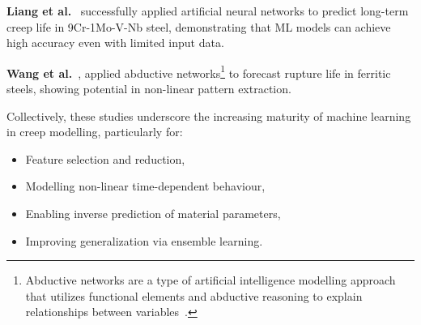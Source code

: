 \documentclass[class=scrbook, crop=false]{standalone}
\begin{document}
\textbf{Liang et al.}~\cite{liang2020ann} successfully applied artificial neural networks to predict long-term creep life in 9Cr-1Mo-V-Nb steel, demonstrating that ML models can achieve high accuracy even with limited input data. 

\textbf{Wang et al.}~\cite{wang2013abductive}, applied abductive networks\footnote{Abductive networks are a type of artificial intelligence modelling approach that utilizes functional elements and abductive reasoning to explain relationships between variables~\cite{montgomery1991abductive}.} to forecast rupture life in ferritic steels, showing potential in non-linear pattern extraction.


Collectively, these studies underscore the increasing maturity of machine learning in creep modelling, particularly for:
\begin{itemize}
	\item Feature selection and reduction,
	\item Modelling non-linear time-dependent behaviour,
	\item Enabling inverse prediction of material parameters,
	\item Improving generalization via ensemble learning.
\end{itemize}



\ifstandalone
	\printglossary
	\printbibliography[heading=bibintoc]
\fi
\end{document}
